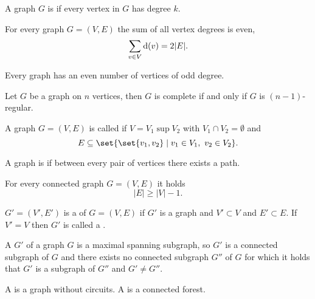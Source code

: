 \begin{definition}
    A graph $G$ is  if every vertex in $G$ has degree $k$.
\end{definition}
\begin{lemma}
    For every graph $G=(V,E)$ the sum of all vertex degrees is even,
    \[
        \sum_{v \in V} \mathop{}\!\mathrm{d}(v) = 2|E|.
    \]
\end{lemma}
\begin{corollary}
    Every graph has an even number of vertices of odd degree.
\end{corollary}
\begin{theorem}
    Let $G$ be a graph on $n$ vertices, then $G$ is complete if and only if $G$ is $(n-1)$-regular.
\end{theorem}

\begin{definition}
    A graph $G=(V,E)$ is called  if $V=V_1 \sup V_2$ with $V_1 \cap V_2 = \emptyset$ and
    \[
        E \subset \set{\set{v_1,v_2}\mid v_1 \in V_1,\ v_2 \in V_2}.
    \]
\end{definition}

\begin{definition}
    A graph is  if between every pair of vertices there exists a path.
\end{definition}

\begin{theorem}
    For every connected graph $G=(V,E)$ it holds
    \[
        |E| \ge |V| - 1.
    \]
\end{theorem}

\begin{definition}
    $G'=(V',E')$ is a  of $G=(V,E)$ if $G'$ is a graph and $V' \subset V$ and $E' \subset E$.
    If $V'=V$ then $G'$ is called a .
\end{definition}

\begin{definition}
    A  $G'$ of a graph $G$ is a maximal spanning subgraph, so $G'$ is a connected subgraph of $G$ and there exists no connected subgraph $G''$ of $G$ for which it holds that $G'$ is a subgraph of $G''$ and $G' \neq G''$.
\end{definition}

\begin{definition}
    A  is a graph without circuits.
    A  is a connected forest.
\end{definition}

